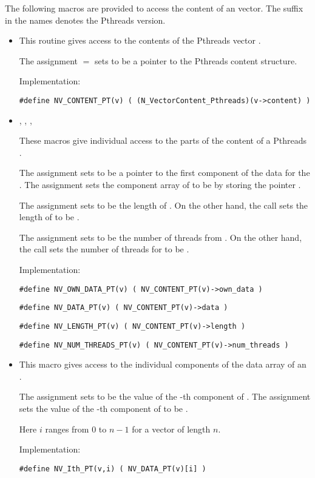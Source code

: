 The following macros are provided to access the content of an {\nvecpthreads}
vector. The suffix  in the names denotes the Pthreads version.
\begin{itemize}

\item {}

  This routine gives access to the contents of the Pthreads
  vector .

  The assignment  $=$  sets
   to be a pointer to the Pthreads  content
  structure.

  Implementation:

  \verb|#define NV_CONTENT_PT(v) ( (N_VectorContent_Pthreads)(v->content) )|

\item {}, , , 


  These macros give individual access to the parts of
  the content of a Pthreads .

  The assignment  sets  to be
  a pointer to the first component of the data for the  .
  The assignment  sets the component array of  to
  be  by storing the pointer .

  The assignment  sets  to be
  the length of . On the other hand, the call 
  sets the length of  to be .

  The assignment  sets  to be
  the number of threads from . On the other hand, the call 
  sets the number of threads for  to be .

  Implementation:

  \verb|#define NV_OWN_DATA_PT(v) ( NV_CONTENT_PT(v)->own_data )|

  \verb|#define NV_DATA_PT(v) ( NV_CONTENT_PT(v)->data )|

  \verb|#define NV_LENGTH_PT(v) ( NV_CONTENT_PT(v)->length )|

  \verb|#define NV_NUM_THREADS_PT(v) ( NV_CONTENT_PT(v)->num_threads )|

\item {}

  This macro gives access to the individual components of the data
  array of an .

  The assignment  sets  to be the value of
  the -th component of . The assignment 
  sets the value of the -th component of  to be .

  Here $i$ ranges from $0$ to $n-1$ for a vector of length $n$.

  Implementation:

  \verb|#define NV_Ith_PT(v,i) ( NV_DATA_PT(v)[i] )|

\end{itemize}

